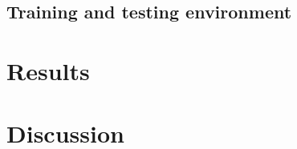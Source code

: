 \documentclass[dwyatte_dissertation.tex]{subfiles}
\begin{document}

%


\subsection{Training and testing environment}

\section{Results}

\section{Discussion}



\end{document}

